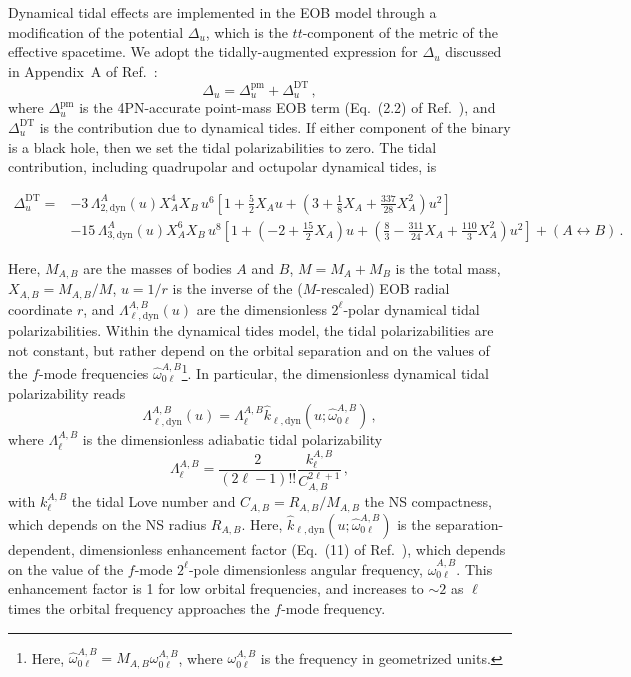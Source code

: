 \documentclass[prd,aps,letter,twocolumn,floatfix,notitlepage,nofootinbib]{revtex4-1}
\begin{document}
Dynamical tidal effects are implemented in the EOB model through a modification of the potential $\Delta_u$, which is the $tt$-component of the metric of the effective spacetime. We adopt the tidally-augmented expression for $\Delta_u$ discussed in Appendix~A of Ref.~\cite{Steinhoff:2016rfi}:
\begin{equation}
\Delta_u = \Delta_u^{\textrm{pm}} + \Delta_u^{\textrm{DT}}\,,
\end{equation}
where $\Delta_u^{\textrm{pm}}$ is the 4PN-accurate point-mass EOB term (Eq.~(2.2) of Ref.~\cite{Bohe:2016gbl}), and $\Delta_u^{\textrm{DT}}$ is the contribution due to dynamical tides. If either component of the binary is a black hole, then we set the tidal polarizabilities to zero. The tidal contribution, including quadrupolar and octupolar dynamical tides, is
\begin{widetext}
\begin{align}
 \Delta_u^{\textrm{DT}} =&  - 3\,\Lambda_{2,\textrm{dyn}}^{A}(u)X_A^4 X_B\,u^6  \left[ 1 + \frac{5}{2} X_Au + \left(3 + \frac{1}{8}X_A + \frac{337}{28} X_A^2\right)u^2 \right]\nonumber\\
 &- 15\,\Lambda_{3,\textrm{dyn}}^{A}(u)X_A^6X_B\,u^8 \left[1 + \left(-2 + \frac{15}{2}X_A\right)u + \left(\frac{8}{3} - \frac{311}{24}X_A + \frac{110}{3}X_A^2\right) u^2\right] + (A \leftrightarrow B)\,.
\end{align}
\end{widetext}
Here, $M_{A,B}$ are the masses of bodies $A$ and $B$, $M = M_A + M_B$ is the total mass, $X_{A,B}=M_{A,B}/M$, $u=1/r$ is the inverse of the ($M$-rescaled) EOB radial coordinate $r$, and $\Lambda_{\ell,\textrm{dyn}}^{A,B}(u)$ are the dimensionless $2^{\ell}$-polar dynamical tidal polarizabilities. Within the dynamical tides model, the tidal polarizabilities are not constant, but rather depend on the orbital separation and on the values of the $f$-mode frequencies $\hat{\omega}_{0\ell}^{A,B}$\footnote{Here, $\hat{\omega}_{0\ell}^{A,B}=M_{A,B}\omega_{0\ell}^{A,B}$, where $\omega_{0\ell}^{A,B}$ is the frequency in geometrized units.}. In particular, the dimensionless dynamical tidal polarizability reads
\begin{equation}
\Lambda_{\ell,\textrm{dyn}}^{A,B}(u)=\Lambda_{\ell}^{A,B}\hat{k}_{\ell, \textrm{dyn}}(u;\hat{\omega}_{0\ell}^{A,B})\,,
\end{equation}
where $\Lambda_{\ell}^{A,B}$ is the dimensionless adiabatic tidal polarizability
\begin{equation}
\Lambda_{\ell}^{A,B}=\frac{2}{(2\ell-1)!!}\frac{k^{A,B}_{\ell}}{C_{A,B}^{2\ell+1}}\,,
\end{equation}
with $k^{A,B}_{\ell}$ the tidal Love number and $C_{A,B}=R_{A,B}/M_{A,B}$ the NS compactness, which depends on the NS radius $R_{A,B}$. Here, $\hat{k}_{\ell, \textrm{dyn}}(u;\hat{\omega}_{0\ell}^{A,B})$ is the separation-dependent, dimensionless enhancement factor (Eq.~(11) of Ref.~\cite{Dietrich:2017feu}), which depends on the value of the $f$-mode $2^\ell$-pole dimensionless angular frequency, $\hat{\omega}_{0\ell}^{A,B}$. This enhancement factor is 1 for low orbital frequencies, and increases to $\sim 2$ as $\ell$ times the orbital frequency approaches the $f$-mode frequency. 
\end{document}
